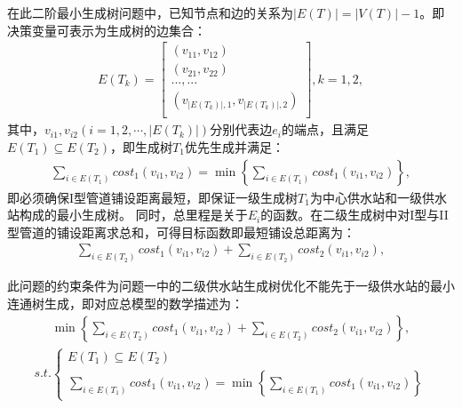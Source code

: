 \documentclass{whutmod}
\begin{document}
		
		
		
			在此二阶最小生成树问题中，已知节点和边的关系为$|E(T)|=|V(T)|-1 $。即决策变量可表示为生成树的边集合：
			\begin{gather}
			E(T_k)=
			\begin{bmatrix}
			(v_{11} ,v_{12}) \\ 
			(v_{21} ,v_{22} )\\ 
			...,...\\
			(v_{|E(T_k)|,1},v_{|E(T_k)|,2})\\
			\end{bmatrix},k=1,2,
			\end{gather}
			其中，$v_{i1}, v_{i2}(i =1,2,\cdots,|E(T_k)|)$分别代表边$e_i$的端点，且满足$E(T_1)\subseteq E(T_2)$，即生成树$T_1$优先生成并满足：
			\begin{gather}
			\sum_{i\in E(T_1) }cost_1(v_{i1},v_{i2})=\min\left \{ 	\sum_{i\in E(T_1) }cost_1(v_{i1},v_{i2}) \right \},
			\end{gather}
			即必须确保I型管道铺设距离最短，即保证一级生成树$T_1$为中心供水站和一级供水站构成的最小生成树。
			 同时，总里程是关于$E_{i}$的函数。在二级生成树中对I型与II型管道的铺设距离求总和，可得目标函数即最短铺设总距离为：
			\begin{gather}
	         	\sum_{i\in E(T_2) }cost_1(v_{i1},v_{i2})+\sum_{i\in E(T_2) }cost_2(v_{i1},v_{i2}),
			\end{gather}
			
			此问题的约束条件为问题一中的二级供水站生成树优化不能先于一级供水站的最小连通树生成，即对应总模型的数学描述为：
			\begin{gather}
			\min \left\{ \sum_{i\in E(T_2) }cost_1(v_{i1},v_{i2})+\sum_{i\in E(T_2) }cost_2(v_{i1},v_{i2}) \right \},
			\end{gather}
			\begin{gather*}
			s.t.\left\{\begin{matrix}
			E(T_{1})\subseteq  E(T_{2})\\ 
			\displaystyle	\sum_{i\in E(T_1) }cost_1(v_{i1},v_{i2})=\min\left \{ \displaystyle	\sum_{i\in E(T_1) }cost_1(v_{i1},v_{i2}) \right \} 
						\end{matrix}\right.
			\end{gather*}
\end{document}
